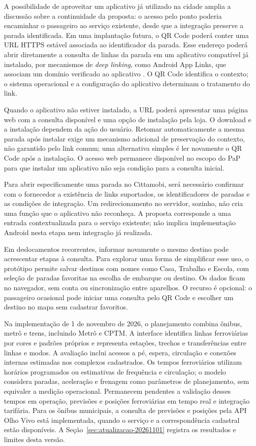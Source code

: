 \documentclass[12pt,oneside,a4paper,brazil,chapter=TITLE]{abntex2}
\begin{document}
A possibilidade de aproveitar um aplicativo já utilizado na cidade amplia a discussão sobre a continuidade da proposta: o acesso pelo ponto poderia encaminhar o passageiro ao serviço existente, desde que a integração preserve a parada identificada. Em uma implantação futura, o QR Code poderá conter uma URL HTTPS estável associada ao identificador da parada. Esse endereço poderá abrir diretamente a consulta de linhas da parada em um aplicativo compatível já instalado, por mecanismos de \textit{deep linking}, como Android App Links, que associam um domínio verificado ao aplicativo \citep{androidapplinks}. O QR Code identifica o contexto; o sistema operacional e a configuração do aplicativo determinam o tratamento do link.

Quando o aplicativo não estiver instalado, a URL poderá apresentar uma página web com a consulta disponível e uma opção de instalação pela loja. O download e a instalação dependem da ação do usuário. Retomar automaticamente a mesma parada após instalar exige um mecanismo adicional de preservação do contexto, não garantido pelo link comum; uma alternativa simples é ler novamente o QR Code após a instalação. O acesso web permanece disponível no escopo do PaP para que instalar um aplicativo não seja condição para a consulta inicial.

Para abrir especificamente uma parada no Cittamobi, será necessário confirmar com o fornecedor a existência de links suportados, os identificadores de paradas e as condições de integração. Um redirecionamento no servidor, sozinho, não cria uma função que o aplicativo não reconheça. A proposta corresponde a uma entrada contextualizada para o serviço existente; não implica implementação Android nesta etapa nem integração já realizada.

Em deslocamentos recorrentes, informar novamente o mesmo destino pode acrescentar etapas à consulta. Para explorar uma forma de simplificar esse uso, o protótipo permite salvar destinos com nomes como Casa, Trabalho e Escola, com seleção de paradas favoritas na escolha de embarque ou destino. Os dados ficam no navegador, sem conta ou sincronização entre aparelhos. O recurso é opcional: o passageiro ocasional pode iniciar uma consulta pelo QR Code e escolher um destino no mapa sem cadastrar favoritos.

Na implementação de 1 de novembro de 2026, o planejamento combina ônibus, metrô e trens, incluindo Metrô e CPTM. A interface identifica linhas ferroviárias por cores e padrões próprios e representa estações, trechos e transferências entre linhas e modos. A avaliação inclui acessos a pé, espera, circulação e conexões internas estimadas nos complexos cadastrados. Os tempos ferroviários utilizam horários programados ou estimativas de frequência e circulação; o modelo considera paradas, aceleração e frenagem como parâmetros de planejamento, sem equivaler a medição operacional. Permanecem pendentes a validação desses tempos em operação, previsões e posições ferroviárias em tempo real e integração tarifária. Para os ônibus municipais, a consulta de previsões e posições pela API Olho Vivo está implementada, quando o serviço e a correspondência cadastral estão disponíveis. A Seção~\ref{sec:atualizacao-20261101} registra os resultados e limites desta versão.
\end{document}
